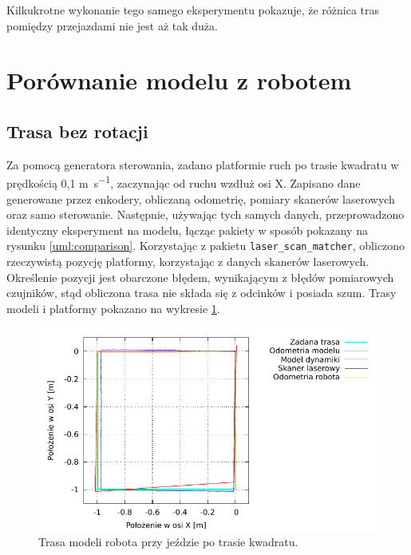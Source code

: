 		Kilkukrotne wykonanie tego samego eksperymentu pokazuje, że różnica tras pomiędzy przejazdami nie jest aż tak duża.
		 
\section{Porównanie modelu z robotem}
	\subsection{Trasa bez rotacji}
		\label{sec:test_velmobil}
		Za pomocą generatora sterowania, zadano platformie ruch po trasie kwadratu w prędkością 0,1 \si{\metre\per\second}, zaczynając od ruchu wzdłuż osi X.
		Zapisano dane generowane przez enkodery, obliczaną odometrię, pomiary skanerów laserowych oraz samo sterowanie.
		Następnie, używając tych samych danych, przeprowadzono identyczny eksperyment na modelu, łącząc pakiety w sposób pokazany na rysunku \ref{uml:comparison}.
		Korzystając z pakietu \texttt{laser\_scan\_matcher}, obliczono rzeczywistą pozycję platformy, korzystając z danych skanerów laserowych.
		Określenie pozycji jest obarczone błędem, wynikającym
		z błędów pomiarowych czujników, stąd obliczona trasa nie składa się z odcinków i posiada szum.
		Trasy modeli i platformy pokazano na wykresie \ref{plot:velmobil_xy}.
		
		\begin{figure}[H]
			\centering
			\includegraphics[width=\textwidth]{plots/velmobil_xy.pdf}
				\caption{Trasa modeli robota przy jeździe po trasie kwadratu.}
			\label{plot:velmobil_xy}
		\end{figure}
		
